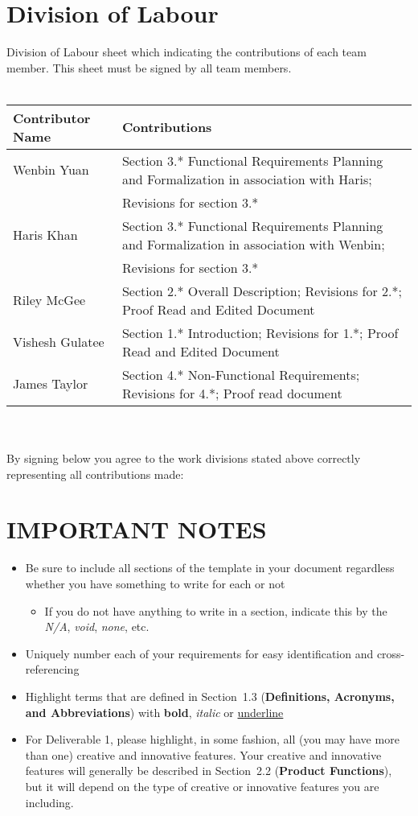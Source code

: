 \documentclass[]{article}
\begin{document}
\newpage
\appendix
\section{Division of Labour}
\label{sec:division_of_labour}
Division of Labour sheet which indicating the contributions of each team member. This sheet must be signed by all team members.
\\
\\
\begin{tabular}{ | l | l | }
\hline
	\textbf{Contributor Name} & \textbf{Contributions}  \\
  	\hline
  	Wenbin Yuan & Section 3.* Functional Requirements Planning and Formalization in association with Haris;\\ & Revisions for section 3.*\\ 		\hline
  	Haris Khan & Section 3.* Functional Requirements Planning and Formalization in association with Wenbin;\\ & Revisions for section 3.* \\
  	\hline
  	Riley McGee & Section 2.* Overall Description; Revisions for 2.*; Proof Read and Edited Document
  	\\
  	\hline
  	Vishesh Gulatee & Section 1.* Introduction; Revisions for 1.*; Proof Read and Edited Document
  	\\
  	\hline
  	James Taylor & Section 4.* Non-Functional Requirements; Revisions for 4.*; Proof read document
  	\\
  	\hline
\end{tabular}
\\
\\
By signing below you agree to the work divisions stated above correctly representing all contributions made:

\nocite{MDes}
\nocite{CAQ}
\newpage
\section*{IMPORTANT NOTES}
\begin{itemize}
	\item Be sure to include all sections of the template in your document regardless whether you have something to write for each or not
	\begin{itemize}
		\item If you do not have anything to write in a section, indicate this by the \emph{N/A}, \emph{void}, \emph{none}, etc.
	\end{itemize}
	\item Uniquely number each of your requirements for easy identification and cross-referencing
	\item Highlight terms that are defined in Section~1.3 (\textbf{Definitions, Acronyms, and Abbreviations}) with \textbf{bold}, \emph{italic} or \underline{underline}
	\item For Deliverable 1, please highlight, in some fashion, all (you may have more than one) creative and innovative features. Your creative and innovative features will generally be described in Section~2.2 (\textbf{Product Functions}), but it will depend on the type of creative or innovative features you are including.
\end{itemize}
\end{document}
